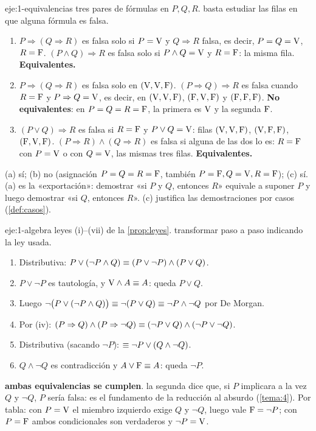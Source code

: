 \begin{solucion}{eje:1-equivalencias}
\datos tres pares de fórmulas en $P,Q,R$.
\planteamiento basta estudiar las filas en que alguna fórmula es falsa.
\pasos
\begin{enumerate}[label=(\alph*)]
  \item $P\Rightarrow(Q\Rightarrow R)$ es falsa solo si $P=\mathrm{V}$ y $Q\Rightarrow R$ falsa, es decir, $P=Q=\mathrm{V}$, $R=\mathrm{F}$. $(P\wedge Q)\Rightarrow R$ es falsa solo si $P\wedge Q=\mathrm{V}$ y $R=\mathrm{F}$: la misma fila. \textbf{Equivalentes.}
  \item $P\Rightarrow(Q\Rightarrow R)$ es falsa solo en $(\mathrm{V},\mathrm{V},\mathrm{F})$. $(P\Rightarrow Q)\Rightarrow R$ es falsa cuando $R=\mathrm{F}$ y $P\Rightarrow Q=\mathrm{V}$, es decir, en $(\mathrm{V},\mathrm{V},\mathrm{F})$, $(\mathrm{F},\mathrm{V},\mathrm{F})$ y $(\mathrm{F},\mathrm{F},\mathrm{F})$. \textbf{No equivalentes}: en $P=Q=R=\mathrm{F}$, la primera es $\mathrm{V}$ y la segunda $\mathrm{F}$.
  \item $(P\vee Q)\Rightarrow R$ es falsa si $R=\mathrm{F}$ y $P\vee Q=\mathrm{V}$: filas $(\mathrm{V},\mathrm{V},\mathrm{F})$, $(\mathrm{V},\mathrm{F},\mathrm{F})$, $(\mathrm{F},\mathrm{V},\mathrm{F})$. $(P\Rightarrow R)\wedge(Q\Rightarrow R)$ es falsa si alguna de las dos lo es: $R=\mathrm{F}$ con $P=\mathrm{V}$ o con $Q=\mathrm{V}$, las mismas tres filas. \textbf{Equivalentes.}
\end{enumerate}
\resultado (a) sí; (b) no (asignación $P=Q=R=\mathrm{F}$, también $P=\mathrm{F},Q=\mathrm{V},R=\mathrm{F}$); (c) sí.
\comprobacion (a) es la «exportación»: demostrar «si $P$ y $Q$, entonces $R$» equivale a suponer $P$ y luego demostrar «si $Q$, entonces $R$». (c) justifica las demostraciones por casos (\cref{def:casos}).
\end{solucion}

\begin{solucion}{eje:1-algebra}
\datos leyes (i)–(vii) de la \cref{prop:leyes}.
\planteamiento transformar paso a paso indicando la ley usada.
\pasos
\begin{enumerate}[label=\arabic*.]
  \item Distributiva: $P\vee(\neg P\wedge Q)\equiv(P\vee\neg P)\wedge(P\vee Q)$.
  \item $P\vee\neg P$ es tautología, y $\mathrm{V}\wedge A\equiv A$: queda $P\vee Q$.
  \item Luego $\neg\bigl(P\vee(\neg P\wedge Q)\bigr)\equiv\neg(P\vee Q)\equiv\neg P\wedge\neg Q$ por De Morgan.
  \item Por (iv): $(P\Rightarrow Q)\wedge(P\Rightarrow\neg Q)\equiv(\neg P\vee Q)\wedge(\neg P\vee\neg Q)$.
  \item Distributiva (sacando $\neg P$): $\equiv\neg P\vee(Q\wedge\neg Q)$.
  \item $Q\wedge\neg Q$ es contradicción y $A\vee\mathrm{F}\equiv A$: queda $\neg P$.
\end{enumerate}
\resultado \textbf{ambas equivalencias se cumplen}.
\comprobacion la segunda dice que, si $P$ implicara a la vez $Q$ y $\neg Q$, $P$ sería falsa: es el fundamento de la reducción al absurdo (\cref{tema:4}). Por tabla: con $P=\mathrm{V}$ el miembro izquierdo exige $Q$ y $\neg Q$, luego vale $\mathrm{F}=\neg P$; con $P=\mathrm{F}$ ambos condicionales son verdaderos y $\neg P=\mathrm{V}$.
\end{solucion}

